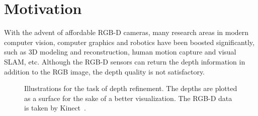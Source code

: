 
\section{Motivation}
With the advent of affordable RGB-D cameras, many research areas in modern computer vision, computer graphics and robotics have been boosted significantly, such as 3D modeling and reconstruction, human motion capture and visual SLAM, etc.
Although the RGB-D sensors can return the depth information in addition to the RGB image, the depth quality is not satisfactory.

\begin{figure}[!ht]
    \centering
    \caption{Illustrations for the task of depth refinement. The depths are plotted as a surface for the sake of a better visualization. The RGB-D data is taken by Kinect~\cite{han2013high}.}
    \label{fig:intro_illu}
\end{figure}


